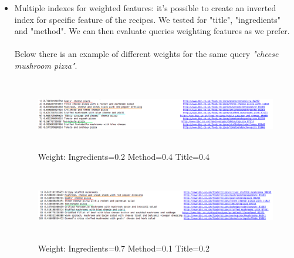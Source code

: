 \documentclass[oneside]{article}			%
\begin{document}
\begin{itemize}
\begin{figure}[h]
		\end{figure}
		\item Multiple indexes for weighted features: it's possible to create an inverted index for specific feature of the recipes. We tested for "title", "ingredients" and "method". We can then evaluate queries weighting features as we prefer.
		\\\\
		Below there is an example of different weights for the same query \textit{"cheese mushroom pizza"}.
		\begin{figure}[h]
			\includegraphics[width=18cm, height=3.1cm]{./report_file/img/4_4_2_ex.png}\caption{Weight: Ingredients=0.2 Method=0.4 Title=0.4}
		\end{figure}
		\begin{figure}[h]
			\includegraphics[width=18cm, height=3.1cm]{./report_file/img/4_4_3_ex.png}\caption{Weight: Ingredients=0.7 Method=0.1 Title=0.2}
		\end{figure}
	\end{itemize}

	\clearpage
\end{document}
